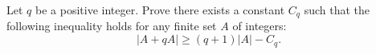 Let $q$ be a positive integer. Prove there exists a constant $C_q$ such that the following inequality holds for any finite set $A$ of integers:
\[|A+qA|\ge (q+1)|A|-C_q.\]

